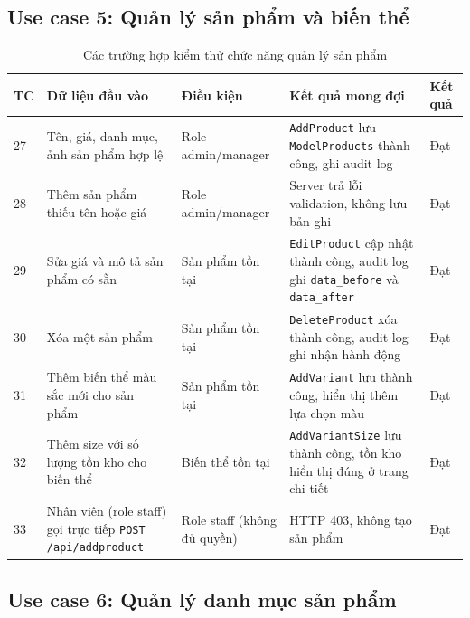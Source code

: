 \documentclass[../DoAn.tex]{subfiles}
\begin{document}
\subsection*{Use case 5: Quản lý sản phẩm và biến thể}

\begin{table}[H]
\centering
\caption{Các trường hợp kiểm thử chức năng quản lý sản phẩm}
\label{tab:test-product}
\scriptsize
\begin{tabular}{|p{0.5cm}|p{3.5cm}|p{3cm}|p{3.5cm}|p{2cm}|}
\hline
\textbf{TC} & \textbf{Dữ liệu đầu vào} & \textbf{Điều kiện} & \textbf{Kết quả mong đợi} & \textbf{Kết quả} \\
\hline
27 & Tên, giá, danh mục, ảnh sản phẩm hợp lệ & Role admin/manager & \texttt{AddProduct} lưu \break \texttt{ModelProducts} thành công, ghi audit log & Đạt \\
\hline
28 & Thêm sản phẩm thiếu tên hoặc giá & Role admin/manager & Server trả lỗi validation, không lưu bản ghi & Đạt \\
\hline
29 & Sửa giá và mô tả sản phẩm có sẵn & Sản phẩm tồn tại & \texttt{EditProduct} cập nhật thành công, audit log ghi \texttt{data\_before} và \break \texttt{data\_after} & Đạt \\
\hline
30 & Xóa một sản phẩm & Sản phẩm tồn tại & \texttt{DeleteProduct} xóa thành công, audit log ghi nhận hành động & Đạt \\
\hline
31 & Thêm biến thể màu sắc mới cho sản phẩm & Sản phẩm tồn tại & \texttt{AddVariant} lưu thành công, hiển thị thêm lựa chọn màu & Đạt \\
\hline
32 & Thêm size với số lượng tồn kho cho biến thể & Biến thể tồn tại & \texttt{AddVariantSize} lưu thành công, tồn kho hiển thị đúng ở trang chi tiết & Đạt \\
\hline
33 & Nhân viên (role staff) gọi trực tiếp \texttt{POST /api/addproduct} & Role staff (không đủ quyền) & HTTP 403, không tạo sản phẩm & Đạt \\
\hline
\end{tabular}
\end{table}

\subsection*{Use case 6: Quản lý danh mục sản phẩm}
\end{document}
